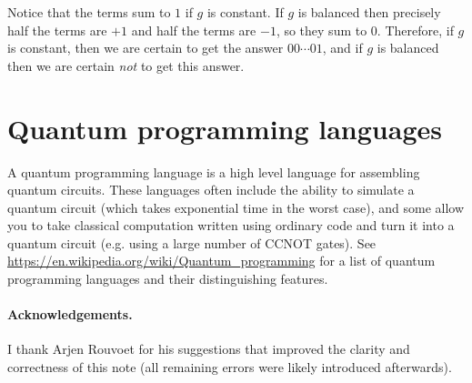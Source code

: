 \documentclass[a4paper, 11pt]{article}
\theoremstyle{definition}
\begin{document}
Notice that the terms sum to $1$ if $g$ is constant. If $g$ is balanced then precisely half the terms are $+1$ and half the terms are $-1$, so they sum to $0$.
Therefore, if $g$ is constant, then we are certain to get the answer $00\cdots01$, and if $g$ is balanced then we are certain \emph{not} to get this answer.

\section{Quantum programming languages}

A quantum programming language is a high level language for assembling quantum circuits.
These languages often include the ability to simulate a quantum circuit (which takes exponential time in the worst case),
and some allow you to take classical computation written using ordinary code and turn it into a quantum circuit (e.g. using a large number of CCNOT gates).
See \url{https://en.wikipedia.org/wiki/Quantum_programming} for a list of quantum programming languages and their distinguishing features.

\paragraph{Acknowledgements.}
I thank Arjen Rouvoet for his suggestions that improved the clarity and correctness of this note (all remaining errors were likely introduced afterwards).



\end{document}
